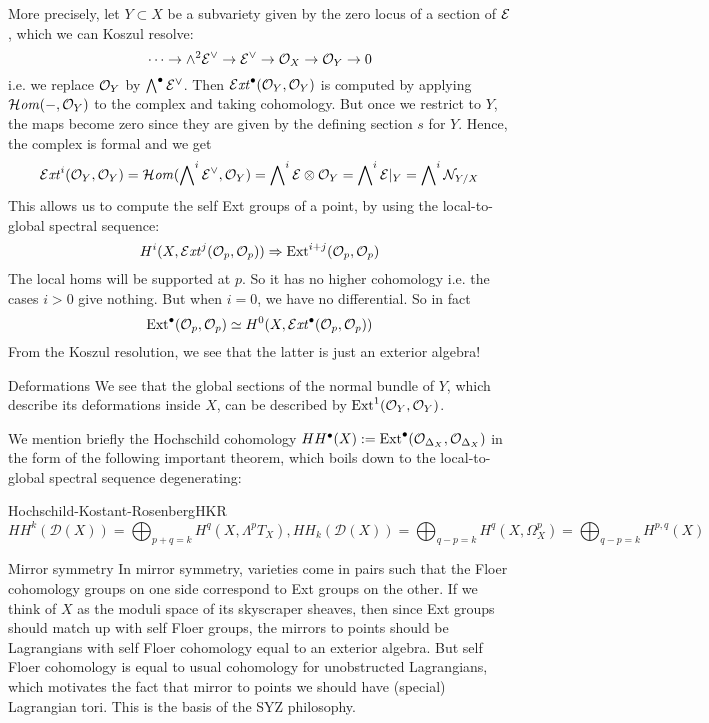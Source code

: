 More precisely, let $Y\subset X$ be a subvariety given by the zero locus of a section of $\mathcal{E}$, which we can Koszul resolve:
\begin{equation*}
    \cdots\to\wedge^2\mathcal{E}^\vee\to\mathcal{E}^\vee\to\mathcal{O}_X\to\mathcal{O}_{Y}\to0
\end{equation*}
i.e. we replace $\mathcal{O}_Y$ by $\bigwedge^\bullet\mathcal{E}^\vee$. Then $\operatorname{\mathcal{E}\mathit{xt}}^\bullet(\mathcal{O}_Y,\mathcal{O}_Y)$ is computed by applying $\operatorname{\mathcal{H}\mathit{om}}(-,\mathcal{O}_Y)$ to the complex and taking cohomology. But once we restrict to $Y$, the maps become zero since they are given by the defining section $s$ for $Y$. Hence, the complex is formal and we get
\begin{equation*}
    \operatorname{\mathcal{E}\mathit{xt}}^i(\mathcal{O}_Y,\mathcal{O}_Y)
        = \operatorname{\mathcal{H}\mathit{om}}(\bigwedge\nolimits^i\mathcal{E}^\vee,\mathcal{O}_Y)
        = \bigwedge\nolimits^i\mathcal{E}\otimes\mathcal{O}_Y
        = \bigwedge\nolimits^i\mathcal{E}|_Y
        = \bigwedge\nolimits^i\mathcal{N}_{Y/X}
\end{equation*}
This allows us to compute the self Ext groups of a point, by using the local-to-global spectral sequence:
\begin{equation*}
    H^i(X,\operatorname{\mathcal{E}\mathit{xt}}^j(\mathcal{O}_p,\mathcal{O}_p)) \Rightarrow \operatorname{Ext}^{i+j}(\mathcal{O}_p,\mathcal{O}_p)
\end{equation*}
The local homs will be supported at $p$. So it has no higher cohomology i.e. the cases $i>0$ give nothing. But when $i=0$, we have no differential. So in fact
\begin{equation*}
    \operatorname{Ext}^\bullet(\mathcal{O}_p,\mathcal{O}_p) \simeq H^0(X,\operatorname{\mathcal{E}\mathit{xt}}^\bullet(\mathcal{O}_p,\mathcal{O}_p))
\end{equation*}
From the Koszul resolution, we see that the latter is just an exterior algebra!

\begin{remark}{Deformations}{}
    We see that the global sections of the normal bundle of $Y$, which describe its deformations inside $X$, can be described by $\operatorname{Ext}^1(\mathcal{O}_Y,\mathcal{O}_Y)$.
\end{remark}
We mention briefly the Hochschild cohomology $HH^\bullet(X):=\operatorname{Ext}^\bullet(\mathcal{O}_{\Delta_X}, \mathcal{O}_{\Delta_X})$ in the form of the following important theorem, which boils down to the local-to-global spectral sequence degenerating:
\begin{theorem}{Hochschild-Kostant-Rosenberg}{HKR}
    $$HH^k(\mathcal{D}(X))=\bigoplus_{p+q=k} H^q(X, \Lambda^p T_X), HH_k(\mathcal{D}(X))=\bigoplus_{q-p=k} H^q(X, \Omega^p_X)=\bigoplus_{q-p=k} H^{p,q}(X)$$

\end{theorem}

\begin{remark}{Mirror symmetry}{}
    In mirror symmetry, varieties come in pairs such that the Floer cohomology groups on one side correspond to Ext groups on the other. If we think of $X$ as the moduli space of its skyscraper sheaves, then since Ext groups should match up with self Floer groups, the mirrors to points should be Lagrangians with self Floer cohomology equal to an exterior algebra. But self Floer cohomology is equal to usual cohomology for unobstructed Lagrangians, which motivates the fact that mirror to points we should have (special) Lagrangian tori. This is the basis of the SYZ philosophy.
\end{remark}

